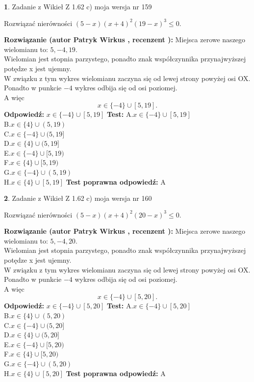 \documentclass[12pt, a4paper]{article}
\theoremstyle{definition} %
\newtheorem{zad}{}
\newcommand{\zadStart}[1]{\begin{zad}#1\newline}
\newcommand{\zadStop}{\end{zad}}
\newcommand{\rozwStart}[2]{\noindent \textbf{Rozwiązanie (autor #1 , recenzent #2): }\newline}
\newcommand{\rozwStop}{\newline}
\newcommand{\odpStart}{\noindent \textbf{Odpowiedź:}\newline}
\newcommand{\odpStop}{\newline}
\newcommand{\testStart}{\noindent \textbf{Test:}\newline}
\newcommand{\testStop}{\newline}
\newcommand{\kluczStart}{\noindent \textbf{Test poprawna odpowiedź:}\newline}
\newcommand{\kluczStop}{\newline}
\begin{document}
\zadStart{Zadanie z Wikieł Z 1.62 c) moja wersja nr 159}

Rozwiązać nierówności $(5-x)(x+4)^{2}(19-x)^{3}\le0$.
\zadStop
\rozwStart{Patryk Wirkus}{}
Miejsca zerowe naszego wielomianu to: $5, -4, 19$.\\
Wielomian jest stopnia parzystego, ponadto znak współczynnika przy\linebreak najwyższej potędze x jest ujemny.\\ W związku z tym wykres wielomianu zaczyna się od lewej strony powyżej osi OX.\\
Ponadto w punkcie $-4$ wykres odbija się od osi poziomej.\\
A więc $$x \in \{-4\} \cup [5,19].$$
\rozwStop
\odpStart
$x \in \{-4\} \cup [5,19]$
\odpStop
\testStart
A.$x \in \{-4\} \cup [5,19]$\\
B.$x \in \{4\} \cup (5,19)$\\
C.$x \in \{-4\} \cup (5,19]$\\
D.$x \in \{4\} \cup (5,19]$\\
E.$x \in \{-4\} \cup [5,19)$\\
F.$x \in \{4\} \cup [5,19)$\\
G.$x \in \{-4\} \cup (5,19)$\\
H.$x \in \{4\} \cup [5,19]$
\testStop
\kluczStart
A
\kluczStop



\zadStart{Zadanie z Wikieł Z 1.62 c) moja wersja nr 160}

Rozwiązać nierówności $(5-x)(x+4)^{2}(20-x)^{3}\le0$.
\zadStop
\rozwStart{Patryk Wirkus}{}
Miejsca zerowe naszego wielomianu to: $5, -4, 20$.\\
Wielomian jest stopnia parzystego, ponadto znak współczynnika przy\linebreak najwyższej potędze x jest ujemny.\\ W związku z tym wykres wielomianu zaczyna się od lewej strony powyżej osi OX.\\
Ponadto w punkcie $-4$ wykres odbija się od osi poziomej.\\
A więc $$x \in \{-4\} \cup [5,20].$$
\rozwStop
\odpStart
$x \in \{-4\} \cup [5,20]$
\odpStop
\testStart
A.$x \in \{-4\} \cup [5,20]$\\
B.$x \in \{4\} \cup (5,20)$\\
C.$x \in \{-4\} \cup (5,20]$\\
D.$x \in \{4\} \cup (5,20]$\\
E.$x \in \{-4\} \cup [5,20)$\\
F.$x \in \{4\} \cup [5,20)$\\
G.$x \in \{-4\} \cup (5,20)$\\
H.$x \in \{4\} \cup [5,20]$
\testStop
\kluczStart
A
\kluczStop
\end{document}
